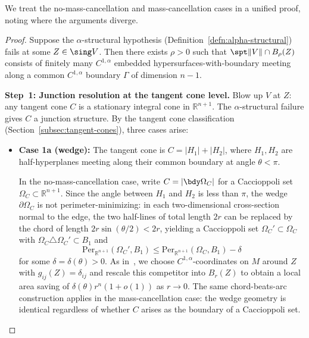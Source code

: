 We treat the no-mass-cancellation and mass-cancellation cases in a unified proof, noting where the arguments diverge.

\begin{proof}
Suppose the $\alpha$-structural hypothesis (Definition~\ref{defn:alpha-structural}) fails at some $Z \in \sing V$. Then there exists $\rho > 0$ such that $\spt\|V\| \cap B_\rho(Z)$ consists of finitely many $C^{1,\alpha}$ embedded hypersurfaces-with-boundary meeting along a common $C^{1,\alpha}$ boundary $\Gamma$ of dimension $n - 1$.

\medskip\noindent\textbf{Step~1: Junction resolution at the tangent cone level.}
Blow up $V$ at $Z$: any tangent cone $C$ is a stationary integral cone in $\mathbb{R}^{n+1}$. The $\alpha$-structural failure gives $C$ a junction structure. By the tangent cone classification (Section~\ref{subsec:tangent-cones}), three cases arise:

\begin{itemize}
    \item \textbf{Case 1a (wedge):} The tangent cone is $C = |H_1| + |H_2|$, where $H_1, H_2$ are half-hyperplanes meeting along their common boundary at angle $\theta < \pi$.

    In the no-mass-cancellation case, write $C = |\bdy\Omega_C|$ for a Caccioppoli set $\Omega_C \subset \mathbb{R}^{n+1}$. Since the angle between $H_1$ and $H_2$ is less than $\pi$, the wedge $\partial\Omega_C$ is not perimeter-minimizing: in each two-dimensional cross-section normal to the edge, the two half-lines of total length $2r$ can be replaced by the chord of length $2r\sin(\theta/2) < 2r$, yielding a Caccioppoli set $\Omega_C' \subset \Omega_C$ with $\Omega_C \triangle \Omega_C' \subset B_1$ and
    \[
        \mathrm{Per}_{\mathbb{R}^{n+1}}(\Omega_C', B_1) \leq \mathrm{Per}_{\mathbb{R}^{n+1}}(\Omega_C, B_1) - \delta
    \]
    for some $\delta = \delta(\theta) > 0$. As in~\cite[Lemma~3.4]{CLS22}, we choose $C^{1,\alpha}$-coordinates on $M$ around $Z$ with $g_{ij}(Z) = \delta_{ij}$ and rescale this competitor into $B_r(Z)$ to obtain a local area saving of $\delta(\theta) r^n (1 + o(1))$ as $r \to 0$. The same chord-beats-arc construction applies in the mass-cancellation case: the wedge geometry is identical regardless of whether $C$ arises as the boundary of a Caccioppoli set.

    \begin{figure}[ht]
        \centering
\end{figure}
\end{itemize}
\end{proof}
